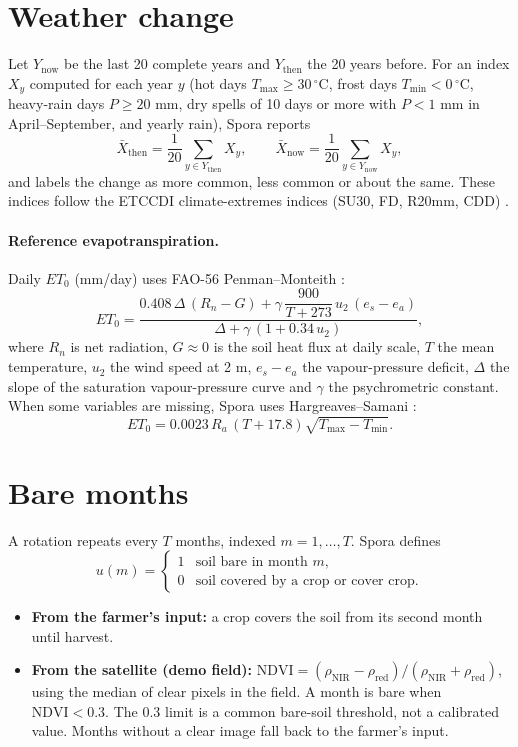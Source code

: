 \documentclass[11pt,a4paper]{article}
\begin{document}
\section{Weather change}
Let $Y_{\text{now}}$ be the last 20 complete years and $Y_{\text{then}}$ the 20 years before. For an index
$X_y$ computed for each year $y$ (hot days $T_{\max}\ge 30\,^\circ$C, frost days $T_{\min}<0\,^\circ$C, heavy-rain days
$P\ge 20$ mm, dry spells of 10 days or more with $P<1$ mm in April--September, and yearly rain), Spora reports
\[
\bar X_{\text{then}}=\frac{1}{20}\sum_{y\in Y_{\text{then}}}X_y,\qquad
\bar X_{\text{now}}=\frac{1}{20}\sum_{y\in Y_{\text{now}}}X_y ,
\]
and labels the change as more common, less common or about the same. These indices follow the ETCCDI
climate-extremes indices (SU30, FD, R20mm, CDD) \cite{zhang2011,ipcc2021}.

\paragraph{Reference evapotranspiration.} Daily $ET_0$ (mm/day) uses FAO-56 Penman--Monteith \cite{fao56}:
\[
ET_0=\frac{0.408\,\Delta\,(R_n-G)+\gamma\,\dfrac{900}{T+273}\,u_2\,(e_s-e_a)}{\Delta+\gamma\,(1+0.34\,u_2)} ,
\]
where $R_n$ is net radiation, $G\approx0$ is the soil heat flux at daily scale, $T$ the mean temperature,
$u_2$ the wind speed at 2 m, $e_s-e_a$ the vapour-pressure deficit, $\Delta$ the slope of the saturation
vapour-pressure curve and $\gamma$ the psychrometric constant. When some variables are missing, Spora uses
Hargreaves--Samani \cite{hargreaves1985}:
\[
ET_0=0.0023\,R_a\,(T+17.8)\sqrt{T_{\max}-T_{\min}} .
\]

\section{Bare months}
A rotation repeats every $T$ months, indexed $m=1,\dots,T$. Spora defines
\[
u(m)=\begin{cases}1 & \text{soil bare in month } m,\\ 0 & \text{soil covered by a crop or cover crop.}\end{cases}
\]
\begin{itemize}
\item \textbf{From the farmer's input:} a crop covers the soil from its second month until harvest.
\item \textbf{From the satellite (demo field):} $\text{NDVI}=(\rho_{\text{NIR}}-\rho_{\text{red}})/(\rho_{\text{NIR}}+\rho_{\text{red}})$, using the median of clear pixels in the field. A month is bare when $\text{NDVI}<0.3$. The 0.3 limit is a common bare-soil threshold, not a calibrated value. Months without a clear image fall back to the farmer's input.
\end{itemize}
\end{document}
